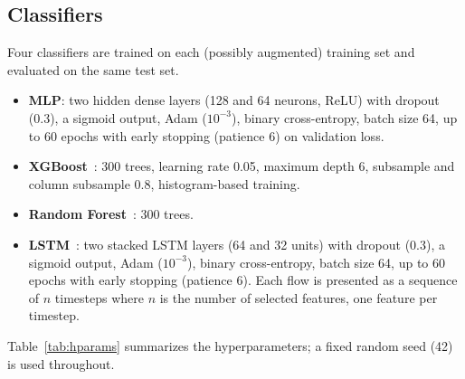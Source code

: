 ﻿\documentclass[journal]{IEEEtran}
\begin{document}
\subsection{Classifiers}
Four classifiers are trained on each (possibly augmented) training set and evaluated on the same test set.
\begin{itemize}
\item \textbf{MLP}: two hidden dense layers (128 and 64 neurons, ReLU) with dropout (0.3), a sigmoid output, Adam ($10^{-3}$), binary cross-entropy, batch size 64, up to 60 epochs with early stopping (patience 6) on validation loss.
\item \textbf{XGBoost}~\cite{chen2016xgboost}: 300 trees, learning rate 0.05, maximum depth 6, subsample and column subsample 0.8, histogram-based training.
\item \textbf{Random Forest}~\cite{breiman2001rf}: 300 trees.
\item \textbf{LSTM}~\cite{hochreiter1997lstm}: two stacked LSTM layers (64 and 32 units) with dropout (0.3), a sigmoid output, Adam ($10^{-3}$), binary cross-entropy, batch size 64, up to 60 epochs with early stopping (patience 6). Each flow is presented as a sequence of $n$ timesteps where $n$ is the number of selected features, one feature per timestep.
\end{itemize}

Table~\ref{tab:hparams} summarizes the hyperparameters; a fixed random seed (42) is used throughout.
\end{document}
